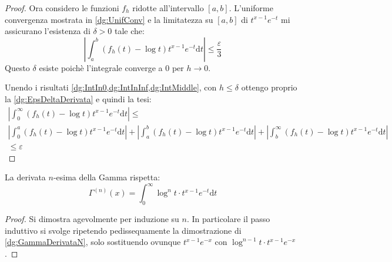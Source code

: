 \begin{proof}
	Ora considero le funzioni $f_h$ ridotte all'intervallo $[a,b]$.
	L'uniforme convergenza mostrata in \cref{dg:UnifConv} e la limitatezza su $[a,b]$ di $t^{x-1}e^{-t}$ mi assicurano
	l'esistenza di $\delta>0$ tale che:
	\begin{equation}\label{dg:IntMiddle}
		\left\lvert \int_a^b \left(f_h(t)-\log{t}\right)t^{x-1}e^{-t}\mathrm{d}t\right\rvert \le \frac{\varepsilon}3
	\end{equation}
	Questo $\delta$ esiste poichè l'integrale converge a 0 per $h\to 0$.
	
	Unendo i risultati \cref{dg:IntIn0,dg:IntInInf,dg:IntMiddle}, con $h\le\delta$ ottengo
	proprio la \cref{dg:EpsDeltaDerivata} e quindi la tesi:
	\begin{multline}
		\left\lvert
		\int_0^{\infty} \left(f_h(t)-\log{t}\right)t^{x-1}e^{-t}\mathrm{d}t
		\right\rvert \le \\
		\left\lvert \int_0^a \left(f_h(t)-\log{t}\right)t^{x-1}e^{-t}\mathrm{d}t\right\rvert +
		\left\lvert \int_a^b \left(f_h(t)-\log{t}\right)t^{x-1}e^{-t}\mathrm{d}t\right\rvert +
		\left\lvert \int_b^{\infty} \left(f_h(t)-\log{t}\right)t^{x-1}e^{-t}\mathrm{d}t\right\rvert \\
		\le \varepsilon
	\end{multline}
\end{proof}
\begin{corollary}\label{dg:GammaDerivataN}
	La derivata $n$-esima della Gamma rispetta:
	\begin{equation*}
		\Gamma^{(n)}(x)=\int_0^{\infty} \log^{n}{t}\cdot t^{x-1}e^{-t}\mathrm{d}t
	\end{equation*}
\end{corollary}
\begin{proof}
	Si dimostra agevolmente per induzione su $n$. In particolare il passo induttivo si svolge
	ripetendo pedissequamente la dimostrazione di \cref{dg:GammaDerivataN}, solo sostituendo ovunque $t^{x-1}e^{-x}$
	con $\log^{n-1}{t}\cdot t^{x-1}e^{-x}$.
\end{proof}




